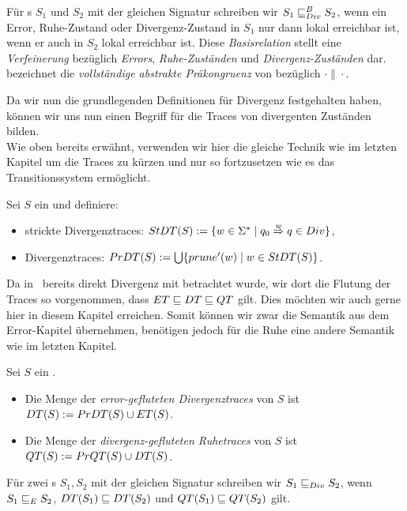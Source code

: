 \begin{Def}
Für \EIO{}s $S_1$ und $S_2$ mit der gleichen Signatur schreiben wir $S_1\sqsubseteq _{Div}^B
S_2$, wenn ein Error, Ruhe-Zustand oder Divergenz-Zustand in $S_1$ nur dann
lokal erreichbar ist, wenn er auch in $S_2$ lokal erreichbar ist. Diese
\emph{Basisrelation} stellt eine \emph{Verfeinerung} bezüglich \emph{Errors},
\emph{Ruhe-Zuständen} und \emph{Divergenz-Zuständen} dar.\\
\DCRel{} bezeichnet die \emph{vollständige abstrakte Präkongruenz} von \DBRel{}
bezüglich $\cdot\|\cdot$.
\end{Def}

Da wir nun die grundlegenden Definitionen für Divergenz festgehalten haben,
können wir uns nun einen Begriff für die Traces von divergenten Zuständen
bilden.\\
Wie oben bereits erwähnt, verwenden wir hier die gleiche Technik wie im letzten
Kapitel um die Traces zu kürzen und nur so fortzusetzen wie es das
Transitionssystem ermöglicht.

\begin{Def}[Divergenztraces]
  Sei $S$ ein \EIO{} und definiere:
  \begin{itemize}
    \item strickte Divergenztraces: $StDT{}(S) := \{w\in\Sigma ^*\mid q_0
      \overset{w}{\Rightarrow} q\in Div\}$,
    \item Divergenztraces: $PrDT{}(S) := \bigcup\{prune' (w)\mid
      w\in StDT{}(S)\}$.
  \end{itemize}
\end{Def}

Da in~\cite{Chilton2013} bereits direkt Divergenz mit betrachtet wurde, wir dort
die Flutung der Traces so vorgenommen, dass $ET\sqsubseteq DT\sqsubseteq QT$
gilt. Dies möchten wir auch gerne hier in diesem Kapitel erreichen. Somit
können wir zwar die Semantik aus dem Error-Kapitel übernehmen, benötigen jedoch
für die Ruhe eine andere Semantik wie im letzten Kapitel.

\begin{Def}
  Sei $S$ ein \EIO{}.
  \begin{itemize}
    \item Die Menge der \emph{error-gefluteten Divergenztraces} von $S$ ist
      $DT{}(S) := PrDT{}(S)\cup ET{}(S)$.
    \item Die Menge der \emph{divergenz-gefluteten Ruhetraces} von $S$ ist
      $QT{}(S) := PrQT{}(S)\cup DT{}(S)$.
  \end{itemize}
  Für zwei \EIO{}s $S_1, S_2$ mit der gleichen Signatur schreiben wir $S_1\sqsubseteq _{Div}
  S_2$, wenn $S_1\sqsubseteq _E S_2$, $DT{}(S_1)\sqsubseteq DT{}(S_2)$ und
  $QT{}(S_1)\sqsubseteq QT{}(S_2)$ gilt.
\end{Def}

